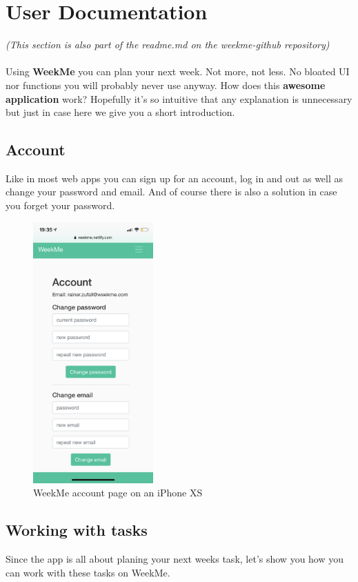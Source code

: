 \section{User Documentation}
\textit{(This section is also part of the readme.md on the weekme-github repository)} \\
\\Using \textbf{WeekMe} you can plan your next week. Not more, not less. No bloated UI nor functions you will probably never use anyway. 
How does this \textbf{awesome application} work? Hopefully it's so intuitive that any explanation is unnecessary but just in case here we give you a short introduction.

\subsection{Account}
Like in most web apps you can sign up for an account, log in and out as well as change your password and email. And of course there is also a solution in case you forget your password. 
\begin{figure}[H] 
	\centering 
	\includegraphics[height=10cm]{figures/user_docu_accounts_page.PNG}   
	\caption[WeekMe account page]{WeekMe account page on an iPhone XS}       
	\label{fig: Setting an environment variable in Heroku}     
\end{figure}  

\subsection{Working with tasks}
Since the app is all about planing your next weeks task, let's show you how you can work with these tasks on WeekMe. 
